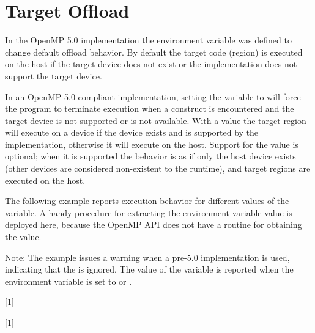 \section{Target Offload}
\label{sec:target_offload}

In the OpenMP 5.0 implementation the 
environment variable was defined to change default offload behavior.
By default the target code (region) is executed on the host if the target device
does not exist or the implementation does not support the target device.  

In an OpenMP 5.0 compliant implementation, setting the 
 variable to  will 
force the program to terminate execution when a  
construct is encountered and the target device is not supported or is not available.
With a value  the target region will execute on a device if the
device exists and is supported by the implementation,
otherwise it will execute on the host.
Support for the 
value is optional; when it is supported the behavior is as if only the 
host device exists (other devices are considered non-existent to the runtime), 
and target regions are executed on the host.  

The following example reports execution behavior for different 
values of the  variable. A handy procedure 
for extracting the  environment variable
value is deployed here, because the OpenMP API does not have a routine 
for obtaining the value. %

Note: 
The example issues a warning when a pre-5.0 implementation is used,
indicating that the  is ignored.
The value of the  variable is reported 
when the  
environment variable is set to  or .

{}[1]

{}[1]


